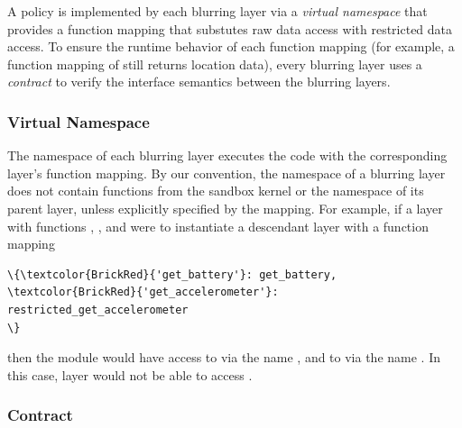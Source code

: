 A policy is implemented by each blurring layer via a \textit{virtual 
namespace} that provides a function mapping that substutes raw 
data access with restricted data access. 
To ensure the runtime behavior of each function mapping (for example, 
a function mapping of  still returns location data), 
every blurring layer uses a \textit{contract} to verify the interface 
semantics between the blurring layers.

\subsubsection{Virtual Namespace}

The namespace of each blurring layer executes the code with the 
corresponding layer's function mapping. By our convention, the 
namespace of a blurring layer does not contain functions from the 
sandbox kernel or the namespace of its parent layer, unless explicitly 
specified by the mapping. For example, if a layer  with 
functions , , 
and  were to instantiate a descendant 
layer  with a function mapping 

\begin{Verbatim}
\{\textcolor{BrickRed}{'get_battery'}: get_battery, 
\textcolor{BrickRed}{'get_accelerometer'}: restricted_get_accelerometer
\}
\end{Verbatim}
then the module  would have access
to  via the name , and to
 via the name 
. In this case, layer  would not 
be able to access .

\subsubsection{Contract}

